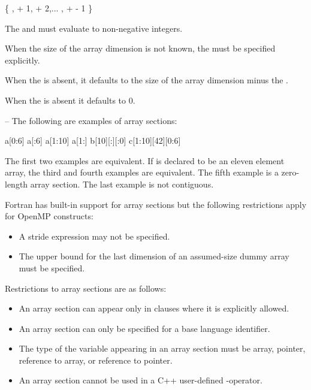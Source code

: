 \{ ,  + 1,  + 2,... ,  +  - 1 \}

The  and  must evaluate to non-negative integers.

When the size of the array dimension is not known, the  must be specified 
explicitly.

When the  is absent, it defaults to the size of the array dimension minus the 
.

When the  is absent it defaults to 0.

\notestart
\noteheader – The following are examples of array sections:

\begin{indentedcodelist}
a[0:6]
a[:6]
a[1:10]
a[1:]
b[10][:][:0]
c[1:10][42][0:6]
\end{indentedcodelist}

The first two examples are equivalent. If  is declared to be an eleven element array, the 
third and fourth examples are equivalent. The fifth example is a zero-length array 
section. The last example is not contiguous.
\noteend
\medskip
\ccppspecificend

\fortranspecificstart
Fortran has built-in support for array sections but the following restrictions apply for 
OpenMP constructs:

\begin{itemize}
\item A stride expression may not be specified.

\item The upper bound for the last dimension of an assumed-size dummy array must be 
specified. 
\end{itemize}
\fortranspecificend

\restrictions
Restrictions to array sections are as follows:

\begin{itemize}
\item An array section can appear only in clauses where it is explicitly allowed.

\ccppspecificstart
\item An array section can only be specified for a base language identifier. 

\item The type of the variable appearing in an array section must be array, pointer, 
reference to array, or reference to pointer.
\ccppspecificend

\cppspecificstart
\item An array section cannot be used in a C++ user-defined \code{[]}-operator.
\cppspecificend
\end{itemize}











